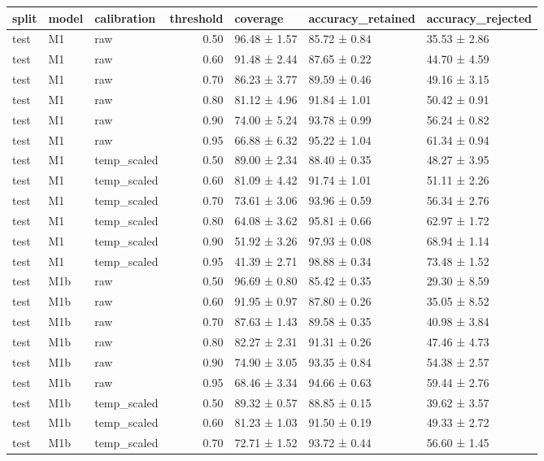 \begin{tabular}{lllrlll}
\toprule
split & model & calibration & threshold & coverage & accuracy\_retained & accuracy\_rejected \\
\midrule
test & M1 & raw & 0.50 & 96.48 ± 1.57 & 85.72 ± 0.84 & 35.53 ± 2.86 \\
test & M1 & raw & 0.60 & 91.48 ± 2.44 & 87.65 ± 0.22 & 44.70 ± 4.59 \\
test & M1 & raw & 0.70 & 86.23 ± 3.77 & 89.59 ± 0.46 & 49.16 ± 3.15 \\
test & M1 & raw & 0.80 & 81.12 ± 4.96 & 91.84 ± 1.01 & 50.42 ± 0.91 \\
test & M1 & raw & 0.90 & 74.00 ± 5.24 & 93.78 ± 0.99 & 56.24 ± 0.82 \\
test & M1 & raw & 0.95 & 66.88 ± 6.32 & 95.22 ± 1.04 & 61.34 ± 0.94 \\
test & M1 & temp\_scaled & 0.50 & 89.00 ± 2.34 & 88.40 ± 0.35 & 48.27 ± 3.95 \\
test & M1 & temp\_scaled & 0.60 & 81.09 ± 4.42 & 91.74 ± 1.01 & 51.11 ± 2.26 \\
test & M1 & temp\_scaled & 0.70 & 73.61 ± 3.06 & 93.96 ± 0.59 & 56.34 ± 2.76 \\
test & M1 & temp\_scaled & 0.80 & 64.08 ± 3.62 & 95.81 ± 0.66 & 62.97 ± 1.72 \\
test & M1 & temp\_scaled & 0.90 & 51.92 ± 3.26 & 97.93 ± 0.08 & 68.94 ± 1.14 \\
test & M1 & temp\_scaled & 0.95 & 41.39 ± 2.71 & 98.88 ± 0.34 & 73.48 ± 1.52 \\
test & M1b & raw & 0.50 & 96.69 ± 0.80 & 85.42 ± 0.35 & 29.30 ± 8.59 \\
test & M1b & raw & 0.60 & 91.95 ± 0.97 & 87.80 ± 0.26 & 35.05 ± 8.52 \\
test & M1b & raw & 0.70 & 87.63 ± 1.43 & 89.58 ± 0.35 & 40.98 ± 3.84 \\
test & M1b & raw & 0.80 & 82.27 ± 2.31 & 91.31 ± 0.26 & 47.46 ± 4.73 \\
test & M1b & raw & 0.90 & 74.90 ± 3.05 & 93.35 ± 0.84 & 54.38 ± 2.57 \\
test & M1b & raw & 0.95 & 68.46 ± 3.34 & 94.66 ± 0.63 & 59.44 ± 2.76 \\
test & M1b & temp\_scaled & 0.50 & 89.32 ± 0.57 & 88.85 ± 0.15 & 39.62 ± 3.57 \\
test & M1b & temp\_scaled & 0.60 & 81.23 ± 1.03 & 91.50 ± 0.19 & 49.33 ± 2.72 \\
test & M1b & temp\_scaled & 0.70 & 72.71 ± 1.52 & 93.72 ± 0.44 & 56.60 ± 1.45 \\

\end{tabular}
